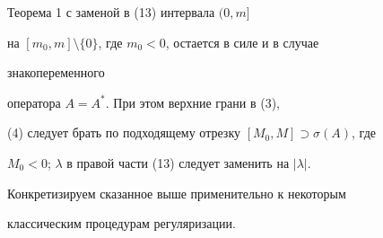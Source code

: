  


\begin{note} 


Теорема 1 с заменой в (13) интервала $(0,m]$ 


на $[m_0,m]\setminus\{0\}$, где $m_0<0$, остается в силе и в случае 


знакопеременного 


оператора $A=A^*$. При этом верхние грани в (3), 


(4) следует брать по подходящему отрезку $[M_0,M]\supset\sigma(A)$, где 


$M_0<0$; $\lambda$ в правой части (13) следует заменить на $|\lambda|$. 


\end{note} 


 


Конкретизируем сказанное выше применительно к некоторым 


классическим процедурам регуляризации. 


 



